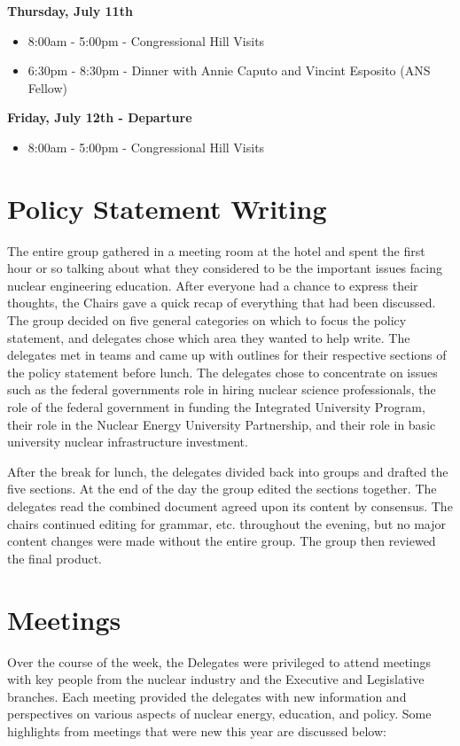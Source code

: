 \documentclass[12pt]{article}
\begin{document}
\textbf{Thursday, July 11th}
\begin{itemize}
\item 8:00am - 5:00pm - Congressional Hill Visits
\item 6:30pm - 8:30pm - Dinner with Annie Caputo and Vincint Esposito (ANS
  Fellow)
\end{itemize}

\textbf{Friday, July 12th - Departure}
\begin{itemize}
\item 8:00am - 5:00pm - Congressional Hill Visits
\end{itemize}

\newpage
\section{Policy Statement Writing}

The entire group gathered in a meeting room at the hotel and spent the first
hour or so talking about what they considered to be the important issues facing
nuclear engineering education. After everyone had a chance to express their
thoughts, the Chairs gave a quick recap of everything that had been
discussed. The group decided on five general categories on which to focus the
policy statement, and delegates chose which area they wanted to help write. The
delegates met in teams and came up with outlines for their respective sections
of the policy statement before lunch. The delegates chose to concentrate on
issues such as the federal governments role in hiring nuclear science
professionals, the role of the federal government in funding the Integrated
University Program, their role in the Nuclear Energy University Partnership, and
their role in basic university nuclear infrastructure investment.

After the break for lunch, the delegates divided back into groups and drafted
the five sections. At the end of the day the group edited the sections
together. The delegates read the combined document agreed upon its content by
consensus. The chairs continued editing for grammar, etc. throughout the
evening, but no major content changes were made without the entire group. The
group then reviewed the final product. 


\newpage
\section{Meetings}

Over the course of the week, the Delegates were privileged to attend meetings
with key people from the nuclear industry and the Executive and Legislative
branches.  Each meeting provided the delegates with new information and
perspectives on various aspects of nuclear energy, education, and policy.  Some
highlights from meetings that were new this year are discussed below:\\
\end{document}
